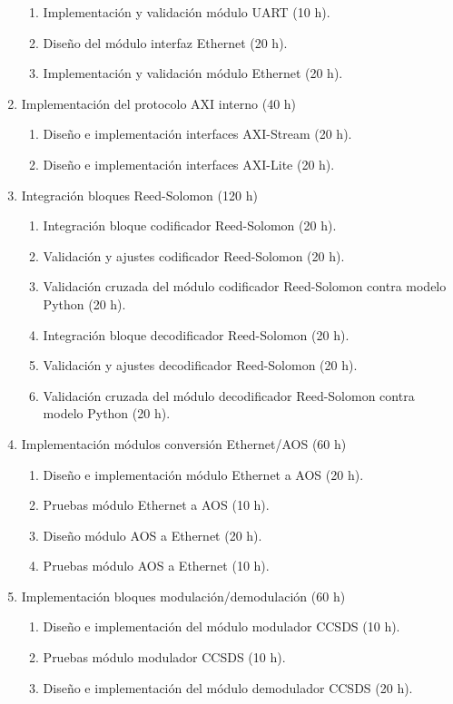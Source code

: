 \documentclass[
11pt, %
]{charter}
\begin{document}
\begin{enumerate}
\begin{enumerate}
	\item Implementación y validación módulo UART (10 h).
	\item Diseño del módulo interfaz Ethernet (20 h).
	\item Implementación y validación módulo Ethernet (20 h).		
	\end{enumerate}
\item  Implementación del protocolo AXI interno (40 h)
	\begin{enumerate}
	\item Diseño e implementación interfaces AXI-Stream (20 h).
	\item Diseño e implementación interfaces AXI-Lite (20 h).
	\end{enumerate}	
\item  Integración bloques Reed-Solomon (120 h)	
	\begin{enumerate}
	\item Integración bloque codificador Reed-Solomon (20 h).
	\item Validación y ajustes codificador Reed-Solomon (20 h).
	\item Validación cruzada del módulo codificador Reed-Solomon contra modelo Python (20 h).	
	\item Integración bloque decodificador Reed-Solomon (20 h).
	\item Validación y ajustes decodificador Reed-Solomon (20 h).
	\item Validación cruzada del módulo decodificador Reed-Solomon contra modelo Python (20 h).		
	\end{enumerate}	
	\item Implementación módulos conversión Ethernet/AOS (60 h)
	\begin{enumerate}
		\item Diseño e implementación módulo Ethernet a AOS (20 h).
		\item Pruebas módulo Ethernet a AOS (10 h).
		\item Diseño módulo AOS a Ethernet (20 h).
		\item Pruebas módulo AOS a Ethernet (10 h).
	\end{enumerate}	
	\item Implementación bloques modulación/demodulación (60 h)
	\begin{enumerate}
		\item Diseño e implementación del módulo modulador CCSDS (10 h).
		\item Pruebas módulo modulador CCSDS (10 h).
		\item Diseño e implementación del módulo demodulador CCSDS (20 h).

\end{enumerate}
\end{enumerate}
\end{document}
